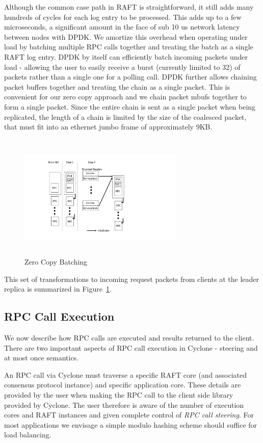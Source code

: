 \documentclass[letterpaper,twocolumn,10pt]{article}
\begin{document}
Although the common case path in RAFT is straightforward, it still adds many
hundreds of cycles for each log entry to be processed. This adds up to a few
microseconds, a significant amount in the face of sub 10 us network latency
between nodes with DPDK. We amortize this overhead when operating under load by
batching multiple RPC calls together and treating the batch as a single RAFT log
entry.  DPDK by itself can efficiently batch incoming packets under load -
allowing the user to easily receive a burst (currently limited to 32) of packets
rather than a single one for a polling call. DPDK further allows chaining packet
buffers together and treating the chain as a single packet. This is convenient
for our zero copy approach and we chain packet mbufs together to form a single
packet. Since the entire chain is sent as a single packet when being replicated,
the length of a chain is limited by the size of the coalesced packet, that must
fit into an ethernet jumbo frame of approximately 9KB.

\begin{figure}
\includegraphics[width=0.7\textwidth,height=6cm]{figures/chain.pdf}
\caption{Zero Copy Batching}
\label{fig:zc_batch}
\end{figure}

This set of transformations to incoming request packets from clients at the
leader replica is summarized in Figure~\ref{fig:zc_batch}. 

\subsection{RPC Call Execution}
\label{sec:exec}
We now describe how RPC calls are executed and results returned to the
client. There are two important aspects of RPC call execution in Cyclone -
steering and at most once semantics.

An RPC call via Cyclone must traverse a specific RAFT core (and associated
consensus protocol instance) and specific application core. These details are
provided by the user when making the RPC call to the client side library
provided by Cyclone. The user therefore is aware of the number of execution
cores and RAFT instances and given complete control of \emph{RPC call steering}.
For most applications we envisage a simple modulo hashing scheme should suffice
for load balancing.
\end{document}
